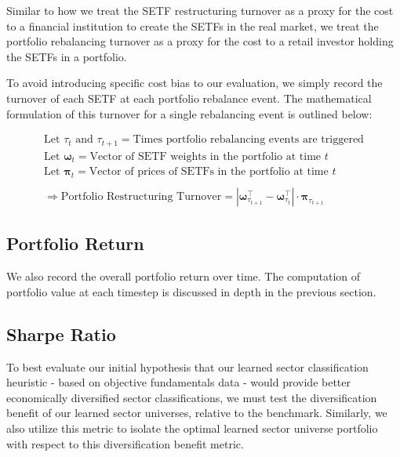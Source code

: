 \documentclass[../main.tex]{subfiles}
\begin{document}
Similar to how we treat the SETF restructuring turnover as a proxy for the cost to a financial institution to create the SETFs in the real market, we treat the portfolio rebalancing turnover as a proxy for the cost to a retail investor holding the SETFs in a portfolio.

To avoid introducing specific cost bias to our evaluation, we simply record the turnover of each SETF at each portfolio rebalance event. The mathematical formulation of this turnover for a single rebalancing event is outlined below:

\begin{gather*}
    \text{Let $\tau_t$ and $\tau_{t+1}$} = \text{Times portfolio rebalancing events are triggered} \\
    \text{Let $\boldsymbol{\omega}_t$} = \text{Vector of SETF weights in the portfolio at time $t$} \\
    \text{Let $\boldsymbol{\pi}_t$} = \text{Vector of prices of SETFs in the portfolio at time $t$} \\
    \\
    \Rightarrow \text{Portfolio Restructuring Turnover} = \left| \boldsymbol{\omega}_{\tau_{t + 1}}^\intercal - \boldsymbol{\omega}_{\tau_t}^\intercal \right| \cdot \boldsymbol{\pi}_{\tau_{t+1}}
\end{gather*}

\pagebreak

\subsection{Portfolio Return}

We also record the overall portfolio return over time. The computation of portfolio value at each timestep is discussed in depth in the previous section.

\subsection{Sharpe Ratio}

To best evaluate our initial hypothesis that our learned sector classification heuristic - based on objective fundamentals data - would provide better economically diversified sector classifications, we must test the diversification benefit of our learned sector universes, relative to the benchmark. Similarly, we also utilize this metric to isolate the optimal learned sector universe portfolio with respect to this diversification benefit metric.
\end{document}
